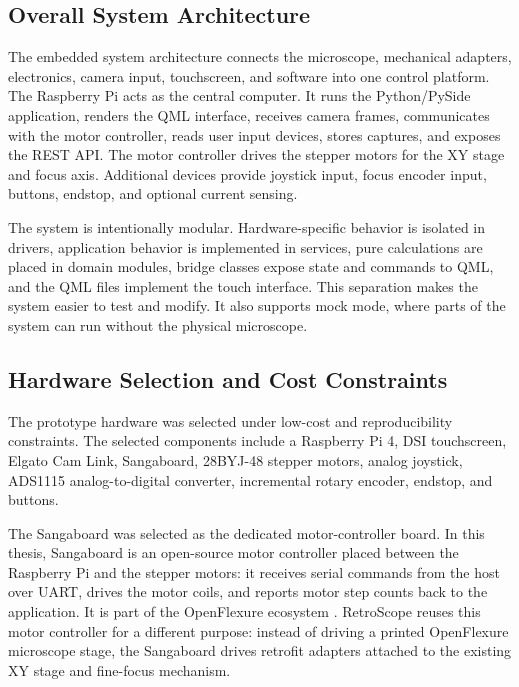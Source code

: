 \subsection{Overall System Architecture}

The embedded system architecture connects the microscope, mechanical adapters, electronics, camera input, touchscreen, and software into one control platform. The Raspberry Pi acts as the central computer. It runs the Python/PySide application, renders the QML interface, receives camera frames, communicates with the motor controller, reads user input devices, stores captures, and exposes the REST API. The motor controller drives the stepper motors for the XY stage and focus axis. Additional devices provide joystick input, focus encoder input, buttons, endstop, and optional current sensing.

The system is intentionally modular. Hardware-specific behavior is isolated in drivers, application behavior is implemented in services, pure calculations are placed in domain modules, bridge classes expose state and commands to QML, and the QML files implement the touch interface. This separation makes the system easier to test and modify. It also supports mock mode, where parts of the system can run without the physical microscope.

\subsection{Hardware Selection and Cost Constraints}

The prototype hardware was selected under low-cost and reproducibility constraints. The selected components include a Raspberry Pi 4, DSI touchscreen, Elgato Cam Link, Sangaboard, 28BYJ-48 stepper motors, analog joystick, ADS1115 analog-to-digital converter, incremental rotary encoder, endstop, and buttons.

The Sangaboard was selected as the dedicated motor-controller board. In this thesis, Sangaboard is an open-source motor controller placed between the Raspberry Pi and the stepper motors: it receives serial commands from the host over UART, drives the motor coils, and reports motor step counts back to the application. It is part of the OpenFlexure ecosystem \cite{collins2020openflexure,openflexureDocs}. RetroScope reuses this motor controller for a different purpose: instead of driving a printed OpenFlexure microscope stage, the Sangaboard drives retrofit adapters attached to the existing XY stage and fine-focus mechanism.

